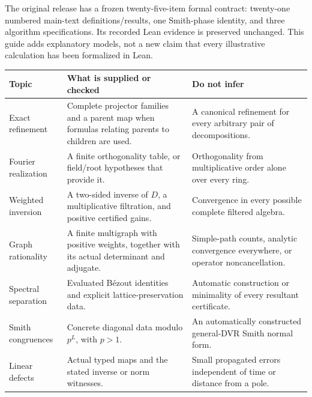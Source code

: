 
The original release has a frozen twenty-five-item formal contract: twenty-one numbered main-text definitions/results, one Smith-phase identity, and three algorithm specifications. Its recorded Lean evidence is preserved unchanged. This guide adds explanatory models, not a new claim that every illustrative calculation has been formalized in Lean.

{\small
\begin{tabularx}{\linewidth}{@{}p{.28\linewidth}YY@{}}\toprule
\textbf{Topic} & \textbf{What is supplied or checked} & \textbf{Do not infer}\\\midrule
Exact refinement & Complete projector families and a parent map when formulas relating parents to children are used. & A canonical refinement for every arbitrary pair of decompositions.\\
Fourier realization & A finite orthogonality table, or field/root hypotheses that provide it. & Orthogonality from multiplicative order alone over every ring.\\
Weighted inversion & A two-sided inverse of $D$, a multiplicative filtration, and positive certified gains. & Convergence in every possible complete filtered algebra.\\
Graph rationality & A finite multigraph with positive weights, together with its actual determinant and adjugate. & Simple-path counts, analytic convergence everywhere, or operator noncancellation.\\
Spectral separation & Evaluated B\'ezout identities and explicit lattice-preservation data. & Automatic construction or minimality of every resultant certificate.\\
Smith congruences & Concrete diagonal data modulo $p^L$, with $p>1$. & An automatically constructed general-DVR Smith normal form.\\
Linear defects & Actual typed maps and the stated inverse or norm witnesses. & Small propagated errors independent of time or distance from a pole.\\\bottomrule
\end{tabularx}}

